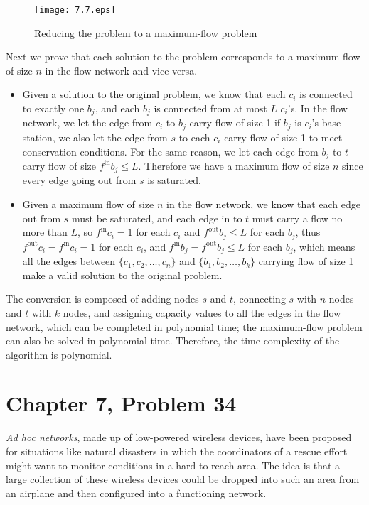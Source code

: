 \documentclass[12pt,letterpaper]{article}
\begin{document}
\begin{figure}
\begin{center}
\texttt{[image: 7.7.eps]}
\caption{Reducing the problem to a maximum-flow problem}
\end{center}
\end{figure}

Next we prove that each solution to the problem corresponds to a maximum flow of size $n$ in the flow network and vice versa.

\begin{itemize}
\item Given a solution to the original problem, we know that each $c_i$ is connected to exactly one $b_j$, and each $b_j$ is connected from at most $L$ $c_i$'s. In the flow network, we let the edge from $c_i$ to $b_j$ carry flow of size 1 if $b_j$ is $c_i$'s base station, we also let the edge from $s$ to each $c_i$ carry flow of size 1 to meet conservation conditions. For the same reason, we let each edge from $b_j$ to $t$ carry flow of size $f^{\textrm{in}}b_j\le L$. Therefore we have a maximum flow of size $n$ since every edge going out from $s$ is saturated.
\item Given a maximum flow of size $n$ in the flow network, we know that each edge out from $s$ must be saturated, and each edge in to $t$ must carry a flow no more than $L$, so $f^{\textrm{in}}c_i=1$ for each $c_i$ and $f^{\textrm{out}}b_j\le L$ for each $b_j$, thus $f^{\textrm{out}}c_i=f^{\textrm{in}}c_i=1$ for each $c_i$, and $f^{\textrm{in}}b_j = f^{\textrm{out}}b_j\le L$ for each $b_j$, which means all the edges between $\{c_1, c_2, \dots, c_n\}$ and $\{b_1, b_2, \dots, b_k\}$ carrying flow of size 1 make a valid solution to the original problem.
\end{itemize}

The conversion is composed of adding nodes $s$ and $t$, connecting $s$ with $n$ nodes and $t$ with $k$ nodes, and assigning capacity values to all the edges in the flow network, which can be completed in polynomial time; the maximum-flow problem can also be solved in polynomial time. Therefore, the time complexity of the algorithm is polynomial.

\section*{Chapter 7, Problem 34}
\emph{Ad hoc networks}, made up of low-powered wireless devices, have been
proposed for situations like natural disasters in which the coordinators
of a rescue effort might want to monitor conditions in a hard-to-reach
area. The idea is that a large collection of these wireless devices could be
dropped into such an area from an airplane and then configured into a
functioning network.
\end{document}
